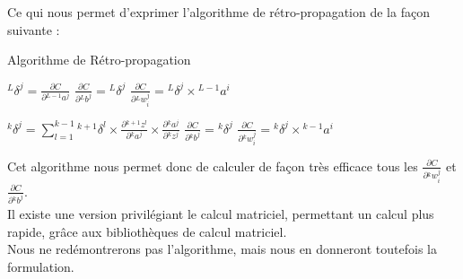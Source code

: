 \documentclass[10pt,a4paper]{report}
\newcommand{\lexp}[1]{\phantom{}^{#1}}
\newcommand{\elem}[4]{\lexp{#2}#1^{#3}_{#4}}
\begin{document}
				Ce qui nous permet d'exprimer l'algorithme de rétro-propagation de la façon suivante :
			\begin{algorithm}[H]
				\caption{Algorithme de Rétro-propagation}
				\begin{algorithmic}
				    \STATE
				    	\STATE $\elem{\delta}{L}{j}{} = \frac{\partial C}{\partial \elem{a}{L-1}{j}{}}$
				    	\STATE $\frac{\partial C}{\partial \elem{b}{L}{j}{}} = \elem{\delta}{L}{j}{}$
					    	\STATE $\frac{\partial C}{\partial \elem{w}{L}{j}{i}} = \elem{\delta}{L}{j}{} \times \elem{a}{L-1}{i}{}$
				    	\ENDFOR
				    \ENDFOR
				    
				    	\STATE
				    		\STATE $\elem{\delta}{k}{j}{} = \sum_{l=1}^{k-1}{\elem{\delta}{k+1}{l}{} \times \frac{\partial \elem{z}{k+1}{l}{}}{\partial \elem{a}{k}{j}{}} \times \frac{\partial \elem{a}{k}{j}{}}{\partial \elem{z}{k}{j}{}}}$
				    		\STATE $\frac{\partial C}{\partial \elem{b}{k}{j}{}} = \elem{\delta}{k}{j}{}$
					    		\STATE $\frac{\partial C}{\partial \elem{w}{k}{j}{i}} = \elem{\delta}{k}{j}{}  \times \elem{a}{k-1}{i}{}$
					    	\ENDFOR
				    	\ENDFOR
				    \ENDFOR
				    
				\end{algorithmic}
			\end{algorithm}
		Cet algorithme nous permet donc de calculer de façon très efficace tous les $\frac{\partial C}{\partial \elem{w}{k}{j}{i}}$ et $\frac{\partial C}{\partial \elem{b}{k}{j}{}}$.\\
		Il existe une version privilégiant le calcul matriciel, permettant un calcul plus rapide, grâce aux bibliothèques de calcul matriciel.\\
		Nous ne redémontrerons pas l'algorithme, mais nous en donneront toutefois la formulation.
\end{document}

